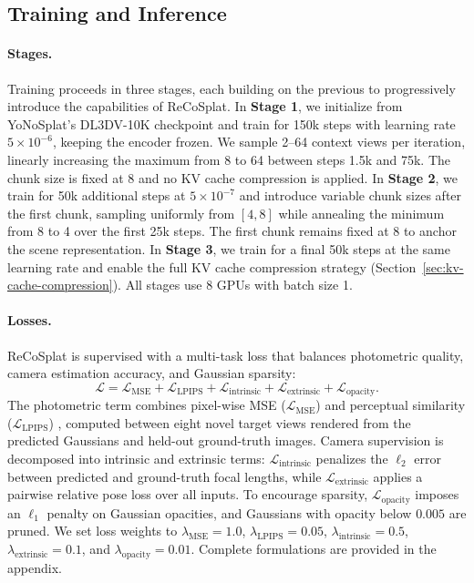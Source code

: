 \documentclass[runningheads]{llncs}
\begin{document}
\vspace{-3mm}
\subsection{Training and Inference}
\label{sec:training_and_inference}

\vspace{-2mm} \paragraph{\textbf{Stages}.}
Training proceeds in three stages, each building on the previous to progressively introduce the capabilities of ReCoSplat. 
In \textbf{Stage 1}, we initialize from YoNoSplat's \cite{ye2025yonosplatneedmodelfeedforward} DL3DV-10K \cite{ling2024dl3dv} checkpoint and train for 150k steps with learning rate $5\times10^{-6}$, keeping the encoder frozen. 
We sample 2–64 context views per iteration, linearly increasing the maximum from 8 to 64 between steps 1.5k and 75k. 
The chunk size is fixed at 8 and no KV cache compression is applied.
In \textbf{Stage 2}, we train for 50k additional steps at $5\times10^{-7}$ and introduce variable chunk sizes after the first chunk, sampling uniformly from $[4,8]$ while annealing the minimum from 8 to 4 over the first 25k steps. 
The first chunk remains fixed at 8 to anchor the scene representation.
In \textbf{Stage 3}, we train for a final 50k steps at the same learning rate and enable the full KV cache compression strategy (Section~\ref{sec:kv-cache-compression}). 
All stages use 8 GPUs with batch size 1.

\vspace{-2mm} \paragraph{\textbf{Losses}.}
ReCoSplat is supervised with a multi-task loss that balances photometric quality, camera estimation accuracy, and Gaussian sparsity:
\begin{equation}
    \mathcal{L} = \mathcal{L}_{\text{MSE}} + \mathcal{L}_{\text{LPIPS}} + 
    \mathcal{L}_{\text{intrinsic}} + \mathcal{L}_{\text{extrinsic}} + \mathcal{L}_{\text{opacity}}.
\end{equation}
The photometric term combines pixel-wise MSE ($\mathcal{L}_{\text{MSE}}$) and perceptual similarity ($\mathcal{L}_{\text{LPIPS}}$) \cite{zhang2018perceptual}, computed between eight novel target views rendered from the predicted Gaussians and held-out ground-truth images. 
Camera supervision is decomposed into intrinsic and extrinsic terms: $\mathcal{L}_{\text{intrinsic}}$ penalizes the $\ell_2$ error between predicted and ground-truth focal lengths, while $\mathcal{L}_{\text{extrinsic}}$ applies a pairwise relative pose loss over all inputs. 
To encourage sparsity, $\mathcal{L}_{\text{opacity}}$ imposes an $\ell_1$ penalty on Gaussian opacities, and Gaussians with opacity below $0.005$ are pruned. 
We set loss weights to $\lambda_{\text{MSE}}=1.0$, $\lambda_{\text{LPIPS}}=0.05$, $\lambda_{\text{intrinsic}}=0.5$, $\lambda_{\text{extrinsic}}=0.1$, and $\lambda_{\text{opacity}}=0.01$. 
Complete formulations are provided in the appendix.
\end{document}
